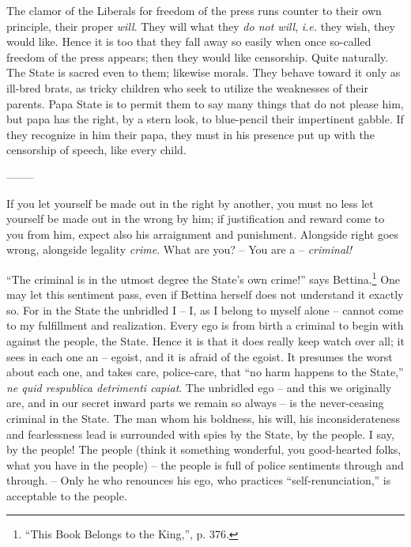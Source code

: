\documentclass[12pt,a4paper]{book}
\begin{document}
The clamor of the Liberals for freedom of the press runs counter to their own 
principle, their proper \textit{will}. They will what they \textit{do not 
will}, \textit{i.e.} they wish, they would like. Hence it is too that they 
fall away so easily when once so-called freedom of the press appears; then 
they would like censorship. Quite naturally. The State is sacred even to them; 
likewise morals. They behave toward it only as ill-bred brats, as tricky 
children who seek to utilize the weaknesses of their parents. Papa State is to 
permit them to say many things that do not please him, but papa has the right, 
by a stern look, to blue-pencil their impertinent gabble. If they recognize in 
him their papa, they must in his presence put up with the censorship of 
speech, like every child.

\begin{center}
--------\end{center}


If you let yourself be made out in the right by another, you must no less let 
yourself be made out in the wrong by him; if justification and reward come to 
you from him, expect also his arraignment and punishment. Alongside right goes 
wrong, alongside legality \textit{crime}. What are you? -- You are a -- 
\textit{criminal!}

``The criminal is in the utmost degree the State's own crime!'' says 
Bettina.\footnote{``This Book Belongs to the King,'', p. 376.} One may let 
this sentiment pass, even if Bettina herself does not understand it exactly 
so. For in the State the unbridled I -- I, as I belong to myself alone -- 
cannot come to my fulfillment and realization. Every ego is from birth a 
criminal to begin with against the people, the State. Hence it is that it does 
really keep watch over all; it sees in each one an -- egoist, and it is afraid 
of the egoist. It presumes the worst about each one, and takes care, 
police-care, that ``no harm happens to the State,'' \textit{ne quid 
respublica detrimenti capiat}. The unbridled ego -- and this we originally 
are, and in our secret inward parts we remain so always -- is the 
never-ceasing criminal in the State. The man whom his boldness, his will, his 
inconsiderateness and fearlessness lead is surrounded with spies by the State, 
by the people. I say, by the people! The people (think it something wonderful, 
you good-hearted folks, what you have in the people) -- the people is full of 
police sentiments through and through. -- Only he who renounces his ego, who 
practices ``self-renunciation,'' is acceptable to the people.
\end{document}
